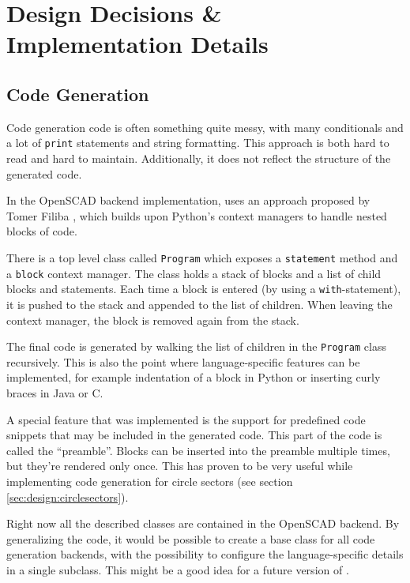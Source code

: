 
\chapter{Design Decisions \& Implementation Details}

\label{ch:design}


\section{Code Generation}

Code generation code is often something quite messy, with many conditionals and
a lot of \texttt{print} statements and string formatting. This  approach is both
hard to read and hard to maintain. Additionally, it does not reflect the
structure of the generated code.

In the OpenSCAD backend implementation, \tangible{} uses an approach proposed by
Tomer Filiba \cite{filiba:2012}, which builds upon Python's context managers to
handle nested blocks of code.

There is a top level class called \texttt{Program} which exposes a
\texttt{statement} method and a \texttt{block} context manager. The class holds
a stack of blocks and a list of child blocks and statements. Each time a block
is entered (by using a \texttt{with}-statement), it is pushed to the stack and
appended to the list of children. When leaving the context manager, the block is
removed again from the stack.

The final code is generated by walking the list of children in the
\texttt{Program} class recursively. This is also the point where
language-specific features can be implemented, for example indentation of a
block in Python or inserting curly braces in Java or C.

A special feature that was implemented is the support for predefined code
snippets that may be included in the generated code. This part of the code is
called the ``preamble''. Blocks can be inserted into the preamble multiple
times, but they're rendered only once. This has proven to be very useful while
implementing code generation for circle sectors (see section
\ref{sec:design:circlesectors}).

Right now all the described classes are contained in the OpenSCAD backend. By
generalizing the code, it would be possible to create a base class for all code
generation backends, with the possibility to configure the language-specific
details in a single subclass. This might be a good idea for a future version of
\tangible{}.

